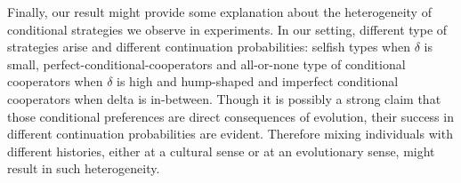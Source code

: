 \documentclass[12pt]{article}
\begin{document}
Finally, our result might provide some explanation about the heterogeneity of conditional strategies we observe in experiments. In our setting, different type of strategies arise and different continuation probabilities: selfish types when $\delta$ is small, perfect-conditional-cooperators and all-or-none type of conditional cooperators when $\delta$ is high and  hump-shaped and imperfect conditional cooperators when delta is in-between. Though it is possibly a strong claim that those conditional preferences are direct consequences of evolution, their success in different continuation probabilities are evident. Therefore mixing individuals with different histories, either at a cultural sense or at an evolutionary sense, might result in such heterogeneity. 

%








\appendix
\label{chap:appx-evo}



  
  
\end{document}
